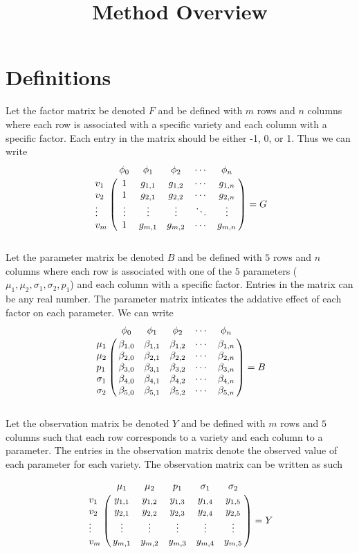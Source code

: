 \documentclass[12pt]{amsart}
\title{Method Overview}
\author{}
\theoremstyle{plain}
\theoremstyle{definition}
\begin{document}
\maketitle


\section{Definitions}

Let the factor matrix be denoted $F$ and be defined with $m$ rows and $n$ columns where each row is associated with a specific variety and each column with a specific factor.
Each entry in the matrix should be either -1, 0, or 1.
Thus we can write\\

$$\bordermatrix{
 & \phi_0 & \phi_1 & \phi_2 & \cdots & \phi_n \cr
v_1 & 1 & g_{1,1} & g_{1,2} & \cdots & g_{1,n} \cr
v_2 & 1 & g_{2,1} & g_{2,2} & \cdots & g_{2,n} \cr
\vdots & \vdots & \vdots & \vdots & \ddots & \vdots \cr
v_m & 1 & g_{m,1} & g_{m,2} & \cdots & g_{m,n} \cr
} = G$$\\

Let the parameter matrix be denoted $B$ and be defined with $5$ rows and $n$ columns where each row is associated with one of the $5$ parameters ($\mu_1, \mu_2, \sigma_1, \sigma_2, p_1$) and each column with a specific factor.
Entries in the matrix can be any real number.
The parameter matrix inticates the addative effect of each factor on each parameter.
We can write\\

$$\bordermatrix{
 & \phi_0 & \phi_1 & \phi_2 & \cdots & \phi_n \cr
\mu_1 & \beta_{1,0} & \beta_{1,1} & \beta_{1,2} & \cdots & \beta_{1,n} \cr
\mu_2 & \beta_{2,0} & \beta_{2,1} & \beta_{2,2} & \cdots & \beta_{2,n} \cr
p_1 & \beta_{3,0} & \beta_{3,1} & \beta_{3,2} & \cdots & \beta_{3,n} \cr 
\sigma_1 & \beta_{4,0} & \beta_{4,1} & \beta_{4,2} & \cdots & \beta_{4,n} \cr
\sigma_2 & \beta_{5,0} & \beta_{5,1} & \beta_{5,2} & \cdots & \beta_{5,n} \cr
} = B$$\\

Let the observation matrix be denoted $Y$ and be defined with $m$ rows and $5$ columns such that each row corresponds to a variety and each column to a parameter.
The entries in the observation matrix denote the observed value of each parameter for each variety.
The observation matrix can be written as such

$$\bordermatrix{
 & \mu_1 & \mu_2 & p_1 & \sigma_1 & \sigma_2 \cr
  v_1 & y_{1,1} & y_{1,2} & y_{1,3} & y_{1,4} & y_{1,5} \cr
  v_2 & y_{2,1} & y_{2,2} & y_{2,3} & y_{2,4} & y_{2,5} \cr
  \vdots & \vdots & \vdots & \vdots & \vdots & \vdots \cr
  v_m & y_{m,1} & y_{m,2} & y_{m,3} & y_{m,4} & y_{m,5} \cr
} = Y$$\\
\end{document}
